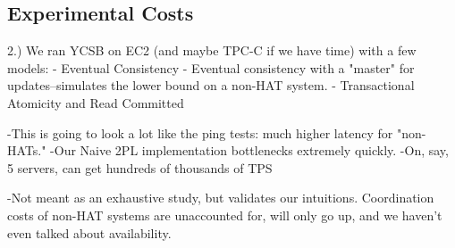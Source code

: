 \subsection{Experimental Costs}


2.) We ran YCSB on EC2 (and maybe TPC-C if we have time) with a few models:
	- Eventual Consistency
	- Eventual consistency with a "master" for updates--simulates the lower bound on a non-HAT system.
	- Transactional Atomicity and Read Committed
	
	-This is going to look a lot like the ping tests: much higher latency for "non-HATs."
	-Our Naive 2PL implementation bottlenecks extremely quickly.
	-On, say, 5 servers, can get hundreds of thousands of TPS

	-Not meant as an exhaustive study, but validates our intuitions. Coordination costs of non-HAT systems are unaccounted for, will only go up, and we haven't even talked about availability.
